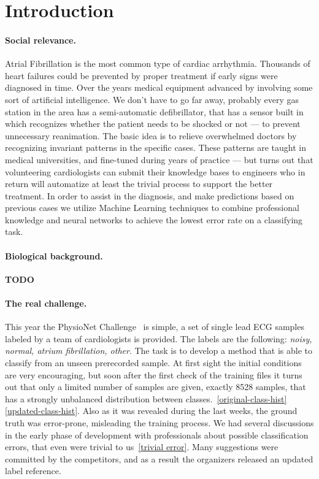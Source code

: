 \section{Introduction}


\paragraph{Social relevance.}
Atrial Fibrillation is the most common type of cardiac arrhythmia.
Thousands of heart failures could be prevented by proper treatment if early signs were diagnosed in time.
Over the years medical equipment advanced by involving some sort of artificial intelligence.
We don't have to go far away, probably every gas station in the area has a semi-automatic defibrillator, that has a sensor built in which recognizes whether the patient needs to be shocked or not --- to prevent unnecessary reanimation.
The basic idea is to relieve overwhelmed doctors by recognizing invariant patterns in the specific cases.
These patterns are taught in medical universities, and fine-tuned during years of practice --- but turns out that volunteering cardiologists can submit their knowledge bases to engineers who in return will automatize at least the trivial process to support the better treatment.
In order to assist in the diagnosis, and make predictions based on previous cases we utilize Machine Learning techniques to combine professional knowledge and neural networks to achieve the lowest error rate on a classifying task.

\paragraph{Biological background.}
\textbf{TODO}

\paragraph{The real challenge.}
This year the PhysioNet Challenge~\cite{physionet} is simple, a set of single lead ECG samples labeled by a team of cardiologists is provided. The labels are the following: \textit{noisy, normal, atrium fibrillation, other}. The task is to develop a method that is able to classify from an unseen prerecorded sample.
At first sight the initial conditions are very encouraging, but soon after the first check of the training files it turns out that only a limited number of samples are given, exactly 8528 samples, that has a strongly unbalanced distribution between classes.~\ref{original-class-hist}
\ref{updated-class-hist}.
Also as it was revealed during the last weeks, the ground truth was error-prone, misleading the training process.
We had several discussions in the early phase of development with professionals about possible classification errors, that even were trivial to us~\ref{trivial error}. Many suggestions were committed by the competitors, and as a result the organizers released an updated label reference.
